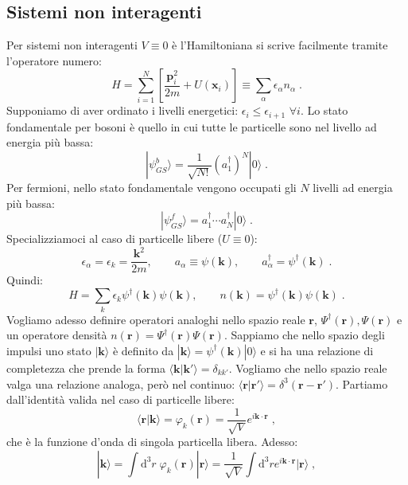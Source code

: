 \documentclass[10pt,a4paper]{report}
\theoremstyle{definition}
\numberwithin{equation}{section}
\newcommand{\diff}[1][]{\mathrm{d}#1}
\newcommand{\bra}{\langle}
\newcommand{\ket}{\rangle}
\begin{document}
\subsection{Sistemi non interagenti}
Per sistemi non interagenti $V\equiv 0$ è l'Hamiltoniana si scrive facilmente tramite l'operatore numero:
\begin{equation}
H=\sum_{i=1}^N\left[\frac{\mathbf{p}_i^2}{2m}+U(\mathbf{x}_i)\right]\equiv \sum_{\alpha}\epsilon_{\alpha}n_{\alpha}\;.
\end{equation}
Supponiamo di aver ordinato i livelli energetici: $\epsilon_i\le \epsilon_{i+1}$ $\forall i$. Lo stato fondamentale per bosoni è quello in cui tutte le particelle sono nel livello ad energia più bassa:
\begin{equation}
|\psi_{GS}^b\ket=\frac{1}{\sqrt{N!}}(a_1^{\dagger})^N|0\ket\;.
\end{equation}
Per fermioni, nello stato fondamentale vengono occupati gli $N$ livelli ad energia più bassa:
\begin{equation}
|\psi_{GS}^f\ket=a_1^{\dagger}\cdots a_N^{\dagger}|0\ket\;.
\end{equation}
Specializziamoci al caso di particelle libere ($U\equiv 0$):
$$
\epsilon_{\alpha}=\epsilon_k=\frac{\mathbf{k}^2}{2m},\qquad a_{\alpha}\equiv \psi(\mathbf{k}),\qquad a_{\alpha}^{\dagger}=\psi^{\dagger}(\mathbf{k})\;.
$$
Quindi:
$$
H=\sum_k \epsilon_k\psi^{\dagger}(\mathbf{k})\psi(\mathbf{k}),\qquad n(\mathbf{k})=\psi^{\dagger}(\mathbf{k})\psi(\mathbf{k})\;.
$$
Vogliamo adesso definire operatori analoghi nello spazio reale $\mathbf{r}$, $\Psi^{\dagger}(\mathbf{r}),\Psi(\mathbf{r})$ e un operatore densità $n(\mathbf{r})=\Psi^{\dagger}(\mathbf{r})\Psi(\mathbf{r})$. Sappiamo che nello spazio degli impulsi uno stato $|\mathbf{k}\ket$ è definito da $|\mathbf{k}\ket=\psi^{\dagger}(\mathbf{k})|0\ket$ e si ha una relazione di completezza che prende la forma $\bra\mathbf{k}|\mathbf{k}'\ket=\delta_{kk'}$. Vogliamo che nello spazio reale valga una relazione analoga, però nel continuo: $\bra \mathbf{r}|\mathbf{r}'\ket=\delta^3(\mathbf{r}-\mathbf{r}')$. Partiamo dall'identità valida nel caso di particelle libere:
\begin{equation}
\bra \mathbf{r}|\mathbf{k}\ket=\varphi_k(\mathbf{r})=\frac{1}{\sqrt{V}}e^{i\mathbf{k}\cdot\mathbf{r}}\;,
\end{equation}
che è la funzione d'onda di singola particella libera. Adesso:
$$
|\mathbf{k}\ket=\int\diff^3{r}\;\varphi_k(\mathbf{r})|\mathbf{r}\ket=\frac{1}{\sqrt{V}}\int\diff^3{r}e^{i\mathbf{k}\cdot\mathbf{r}}|\mathbf{r}\ket\;,
$$
\end{document}
